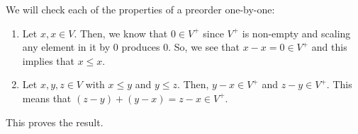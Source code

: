 %
%
\label {sol: properties of the order on a preordered vector space}We will check each of the properties of a preorder one-by-one:
\begin{enumerate}
    \item Let $x,x \in V$. Then, we know that $0 \in V^+$ since $V^+$ is non-empty and scaling any element in it by $0$ produces $0$. So, we see that $x-x = 0 \in V^+$ and this implies that $x \leq x$.
    \item Let $x,y,z \in V$ with $x \leq y$ and $y \leq z$. Then, $y-x \in V^+$ and $z-y \in V^+$. This means that $(z-y) + (y-x) = z-x \in V^+$.
\end{enumerate}
This proves the result.
